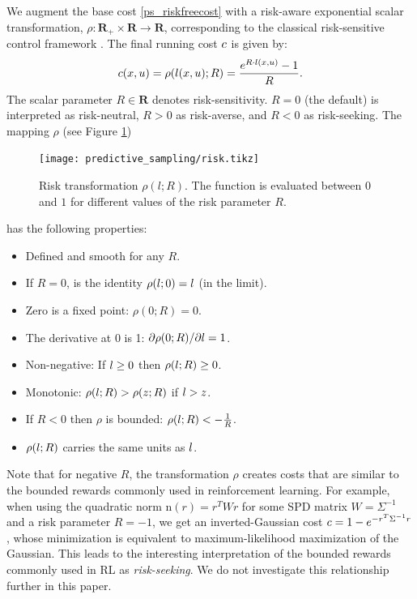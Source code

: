 We augment the base cost \eqref{ps_riskfreecost} with a risk-aware exponential scalar transformation, $\rho : \mathbf{R}_+ \times \mathbf{R} \rightarrow \mathbf{R}$, corresponding to the classical risk-sensitive control framework \cite{jacobson1973optimal, whittle1981risk}. The final running cost ${c}$ is given by:
\begin{equation}
	{c}({x}, {u}) = \rho({l}({x}, {u}) ; R) = \frac{e^{R\cdot {l}({x}, {u})} - 1}{R}.
	\label{ps_riskfunc}
\end{equation}
The scalar parameter $R \in \mathbf{R}$ denotes risk-sensitivity. $R=0$ (the default) is interpreted as risk-neutral, $R>0$ as risk-averse, and $R<0$ as risk-seeking.
The mapping $\rho$ (see Figure \ref{ps_riskfig})

\begin{figure}[H]
	\centering
	\texttt{[image: predictive\_sampling/risk.tikz]}
	\caption[Risk transformation]{Risk transformation $\rho(l ; R)$. The function is evaluated between $0$ and $1$ for different values of the risk parameter $R$.}
	\label{ps_riskfig}
\end{figure}

has the following properties:

\begin{itemize}
	\item Defined and smooth for any $R$.
	\item If $R=0$, is the identity $\rho({l}; 0) = {l}$ (in the limit).
	\item Zero is a fixed point: $\rho(0; R) = 0$.
	\item The derivative at 0 is 1: $\partial \rho(0; R) / \partial {l} = 1$.
	\item Non-negative: If ${l} \geq 0$ then $\rho({l}; R) \geq 0$.
	\item Monotonic: $\rho({l}; R) > \rho(z; R)$ if ${l} > z$.
	\item If $R<0$ then $\rho$ is bounded: $\rho({l}; R) < - \frac{1}{R}$.
	\item $\rho({l};R)$ carries the same units as ${l}$.
\end{itemize}

Note that for negative $R$, the transformation $\rho$ creates costs that are similar to the bounded rewards commonly used in reinforcement learning. For example, when using the quadratic norm $\text{n}(r) = r^T W r$ for some SPD matrix $W=\Sigma^{-1}$ and a risk parameter $R=-1$, we get an inverted-Gaussian cost ${c}=1 - e^{-r^T \Sigma^{-1} r}$, whose minimization is equivalent to maximum-likelihood maximization of the Gaussian. This leads to the interesting interpretation of the bounded rewards commonly used in RL as \emph{risk-seeking}. We do not investigate this relationship further in this paper.

